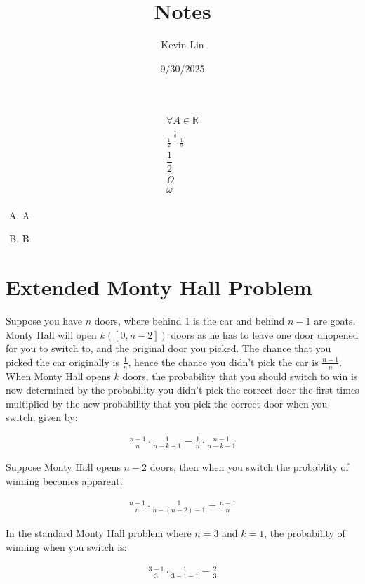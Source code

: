 \documentclass[11pt,a4paper,margin=1in]{article}
\title{Notes}
\author{Kevin Lin}
\date{9/30/2025}
\begin{document}
\maketitle
\section{}
\begin{gather*}
\forall A \in \mathbb{R}\\
\frac{\frac{1}{8}}{\frac{1}{2} + \frac{1}{8}}\\
\dfrac{1}{2}\\
\Omega\\
\omega\\
\end{gather*}
\begin{enumerate}[A.]
    \item A
    \item B
\end{enumerate}

\section{Extended Monty Hall Problem}
\begin{flushleft}
    Suppose you have $n$ doors, where behind 1 is the car and behind $n - 1$ are
    goats. Monty Hall will open $k ([0, n - 2])$ doors as he has to leave one door
    unopened for you to switch to, and the original door you picked. The chance
    that you picked the car originally is $\frac{1}{n}$, hence the chance you didn't
    pick the car is $\frac{n - 1}{n}$. When Monty Hall opens $k$ doors, the probability
    that you should switch to win is now determined by the probability you didn't 
    pick the correct door the first times multiplied by the new probability that
    you pick the correct door when you switch, given by:
\end{flushleft}
\begin{gather*}
    \frac{n - 1}{n} \cdot \frac{1}{n - k - 1} = \frac{1}{n} \cdot \frac{n - 1}{n - k - 1}
\end{gather*}
\begin{flushleft}
    Suppose Monty Hall opens $n - 2$ doors, then when you switch the probablity
    of winning becomes apparent:
\end{flushleft}
\begin{gather*}
    \frac{n - 1}{n} \cdot \frac{1}{n - (n - 2) - 1} = \frac{n - 1}{n}
\end{gather*}
\begin{flushleft}
    In the standard Monty Hall problem where $n = 3$ and $k = 1$, the probability 
    of winning when you switch is:
\end{flushleft}
\begin{gather*}
    \frac{3 - 1}{3} \cdot \frac{1}{3 - 1 - 1} = \frac{2}{3}
\end{gather*}
\end{document}

